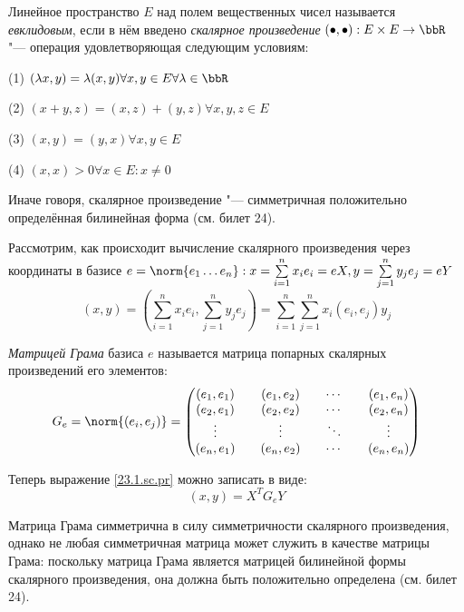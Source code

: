 \begin{defn}
Линейное пространство $E$ над полем вещественных чисел называется \textit{евклидовым}, если в нём введено \textit{скалярное произведение} $(\bullet,\bullet): E\times E \rightarrow \bbR$ "--- операция удовлетворяющая следующим условиям:

(1) $(\lambda x,y)=\lambda(x,y) \forall x,y \in E \forall \lambda \in \bbR$

(2) $(x+y,z)=(x,z)+(y,z) \forall x,y,z \in E$

(3) $(x,y)=(y,x) \forall x,y \in E$

(4) $(x,x)>0 \forall x \in E: x \neq 0$
\end{defn}
  \begin{notion}
  Иначе говоря, скалярное произведение "--- симметричная положительно определённая билинейная форма (см. билет 24).
  \end{notion}
  Рассмотрим, как происходит вычисление скалярного произведения через координаты в базисе $e=\norm{e_1 \ldots e_n}:x=\sum\limits_{i=1}^nx_ie_i=eX, y=\sum\limits_{j=1}^ny_je_j=eY$
  \begin{equation}\label{23.1.sc.pr}
  (x,y)=(\sum\limits_{i=1}^nx_ie_i,\sum\limits_{j=1}^ny_je_j)=\sum\limits_{i=1}^n\sum\limits_{j=1}^nx_i(e_i,e_j)y_j
  \end{equation}
  \begin{defn}
  \textit{Матрицей Грама} базиса $e$ называется матрица попарных скалярных произведений его элементов:
  \begin{equation}
  G_e=\norm{(e_i,e_j)}=\begin{pmatrix}
  (e_1,e_1)&&(e_1,e_2)&&\cdots&&(e_1,e_n)\\
  (e_2,e_1)&&(e_2,e_2)&&\cdots&&(e_2,e_n)\\
  \vdots   && \vdots  &&\ddots&& \vdots  \\
  (e_n,e_1)&&(e_n,e_2)&&\cdots&&(e_n,e_n)\\
  \end{pmatrix}
  \end{equation}
  \end{defn}
  Теперь выражение \ref{23.1.sc.pr} можно записать в виде:
  \begin{equation}
  (x,y)=X^TG_eY
  \end{equation}
  \begin{notion}
  Матрица Грама симметрична в силу симметричности скалярного произведения, однако не любая симметричная матрица может служить в качестве матрицы Грама: поскольку матрица Грама является матрицей билинейной формы скалярного произведения, она должна быть положительно определена (см. билет 24).
  \end{notion}
  

